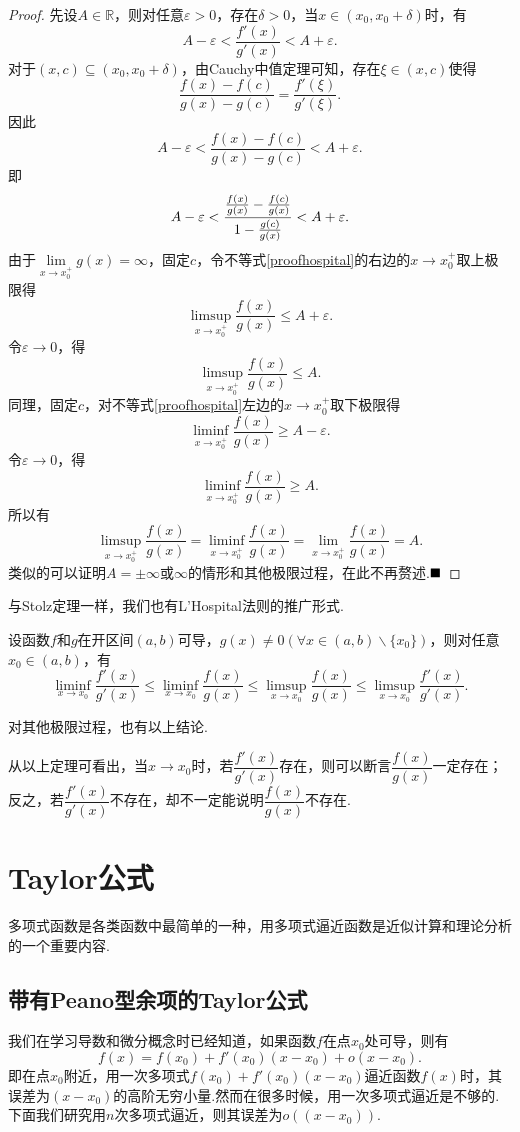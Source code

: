 \begin{proof}
	先设$A\in \mathbb{R}$，则对任意$\varepsilon>0$，存在$\delta>0$，当$x\in(x_0,x_0+\delta)$时，有
	$$A-\varepsilon<\frac{f'(x)}{g'(x)}<A+\varepsilon.$$
	对于$(x,c)\subseteq (x_0,x_0+\delta)$，由Cauchy中值定理可知，存在$\xi\in(x,c)$使得
	$$\frac{f(x)-f(c)}{g(x)-g(c)}=\frac{f'(\xi)}{g'(\xi)}.$$
	因此
	$$A-\varepsilon<\frac{f(x)-f(c)}{g(x)-g(c)}<A+\varepsilon.$$
	即
	\begin{equation}{\label{proofhospital}}
		A-\varepsilon<\frac{\frac{f(x)}{g(x)}-\frac{f(c)}{g(x)}}{1-\frac{g(c)}{g(x)}}<A+\varepsilon.
	\end{equation}
	由于$\lim\limits_{x\to x_0^+}g(x)=\infty$，固定$c$，令不等式\ref{proofhospital}的右边的$x\to x_0^+$取上极限得
	$$\limsup\limits_{x\to x_0^+}\frac{f(x)}{g(x)}\leqslant A+\varepsilon.$$
	令$\varepsilon\to 0$，得
	$$\limsup\limits_{x\to x_0^+}\frac{f(x)}{g(x)}\leqslant A.$$
	同理，固定$c$，对不等式\ref{proofhospital}左边的$x\to x_0^+$取下极限得
	$$\liminf\limits_{x\to x_0^+}\frac{f(x)}{g(x)}\geqslant A-\varepsilon.$$
	令$\varepsilon\to 0$，得
	$$\liminf\limits_{x\to x_0^+}\frac{f(x)}{g(x)}\geqslant A.$$
	所以有
	$$\limsup\limits_{x\to x_0^+}\frac{f(x)}{g(x)}=\liminf\limits_{x\to x_0^+}\frac{f(x)}{g(x)}=\lim\limits_{x\to x_0^+}\frac{f(x)}{g(x)}=A.$$
	类似的可以证明$A=\pm\infty$或$\infty$的情形和其他极限过程，在此不再赘述.$\hfill\blacksquare$
\end{proof}
与Stolz定理一样，我们也有L'Hospital法则的推广形式.
\begin{theorem}
	设函数$f$和$g$在开区间$(a,b)$可导，$g(x)\neq 0(\forall x\in(a,b)\backslash\{x_0\})$，则对任意$x_0\in(a,b)$，有
	$$\liminf\limits_{x\to x_0}\frac{f'(x)}{g'(x)}\leqslant\liminf\limits_{x\to x_0}\frac{f(x)}{g(x)}\leqslant\limsup\limits_{x\to x_0}\frac{f(x)}{g(x)}\leqslant\limsup\limits_{x\to x_0}\frac{f'(x)}{g'(x)}.$$
\end{theorem}
\begin{remark}
	对其他极限过程，也有以上结论.
\end{remark}
从以上定理可看出，当$x\to x_0$时，若$\dfrac{f'(x)}{g'(x)}$存在，则可以断言$\dfrac{f(x)}{g(x)}$一定存在；反之，若$\dfrac{f'(x)}{g'(x)}$不存在，却不一定能说明$\dfrac{f(x)}{g(x)}$不存在.
\section{Taylor公式}
多项式函数是各类函数中最简单的一种，用多项式逼近函数是近似计算和理论分析的一个重要内容.
\subsection{带有Peano型余项的Taylor公式}
我们在学习导数和微分概念时已经知道，如果函数$f$在点$x_0$处可导，则有
$$f(x)=f(x_0)+f'(x_0)(x-x_0)+o(x-x_0).$$
即在点$x_0$附近，用一次多项式$f(x_0)+f'(x_0)(x-x_0)$逼近函数$f(x)$时，其误差为$(x-x_0)$的高阶无穷小量.然而在很多时候，用一次多项式逼近是不够的.下面我们研究用$n$次多项式逼近，则其误差为$o((x-x_0))$.

